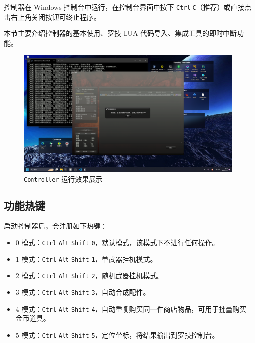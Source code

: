 控制器在 Windows 控制台中运行，在控制台界面中按下 \lstinline{Ctrl} \lstinline{C}（推荐）或直接点击右上角关闭按钮可终止程序。

本节主要介绍控制器的基本使用、罗技 LUA 代码导入、集成工具的即时中断功能。

\begin{figure}[H]
    \Centering
    \includegraphics[width=\textwidth]{docs/assets/controller.png}
    \caption{\lstinline{Controller} 运行效果展示}
\end{figure}

\subsection{功能热键}

启动控制器后，会注册如下热键：

\begin{itemize}

    \item 0 模式：\lstinline{Ctrl} \lstinline{Alt} \lstinline{Shift} \lstinline{0}，默认模式，该模式下不进行任何操作。

    \item 1 模式：\lstinline{Ctrl} \lstinline{Alt} \lstinline{Shift} \lstinline{1}，单武器挂机模式。

    \item 2 模式：\lstinline{Ctrl} \lstinline{Alt} \lstinline{Shift} \lstinline{2}，随机武器挂机模式。

    \item 3 模式：\lstinline{Ctrl} \lstinline{Alt} \lstinline{Shift} \lstinline{3}，自动合成配件。

    \item 4 模式：\lstinline{Ctrl} \lstinline{Alt} \lstinline{Shift} \lstinline{4}，自动重复购买同一件商店物品，可用于批量购买金币道具。

    \item 5 模式：\lstinline{Ctrl} \lstinline{Alt} \lstinline{Shift} \lstinline{5}，定位坐标，将结果输出到罗技控制台。

\end{itemize}


